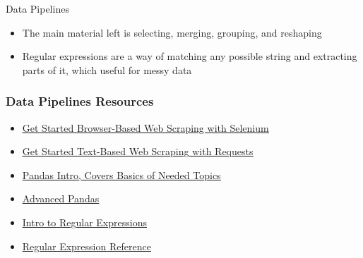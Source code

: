 \documentclass[handout, 11pt]{beamer}
\begin{document}
\begin{section}{Data Pipelines}
\begin{frame}
\begin{itemize}
\vfill
\item The main material left is selecting, merging, grouping, and reshaping
\vfill
\item Regular expressions are a way of matching any possible string and extracting parts of it, which useful for messy data
\end{itemize}
\end{frame}
\begin{frame}
\frametitle{Data Pipelines Resources}
\begin{itemize}
\item \textcolor{blue}{\underline{\href{https://stackabuse.com/getting-started-with-selenium-and-python/}{Get Started Browser-Based Web Scraping with Selenium}}}
\vfill
\item \textcolor{blue}{\underline{\href{https://realpython.com/python-requests/}{Get Started Text-Based Web Scraping with Requests}}}
\vfill
\item \textcolor{blue}{\underline{\href{https://pandas.pydata.org/pandas-docs/stable/getting\_started/10min.html}{Pandas Intro, Covers Basics of Needed Topics}}}
\vfill
\item \textcolor{blue}{\underline{\href{https://pandas.pydata.org/pandas-docs/stable/user\_guide/cookbook.html\#cookbook}{Advanced Pandas}}}
\vfill
\item \textcolor{blue}{\underline{\href{https://scotch.io/tutorials/an-introduction-to-regex-in-python}{Intro to Regular Expressions}}}
\vfill
\item \textcolor{blue}{\underline{\href{https://docs.python.org/3/library/re.html}{Regular Expression Reference}}}
\end{itemize}
\end{frame}
\end{section}
\end{document}
